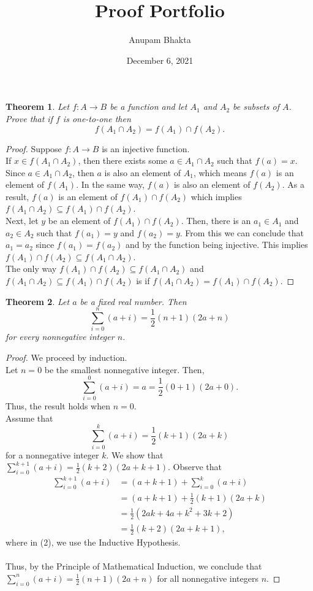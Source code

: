 \documentclass[11pt]{article}
\date{December 6, 2021}
\title{Proof Portfolio}
\author{Anupam Bhakta}
\newtheorem{theorem}{Theorem}
\begin{document}
	
\maketitle

\begin{theorem}
	Let $f:A\to B$ be a function and let $A_1$ and $A_2$ be subsets of $A$.  Prove that if $f$ is one-to-one then 
	\[f(A_1\cap A_2)=f(A_1)\cap f(A_2).\]
\end{theorem}

\begin{proof}
	Suppose $f:A\to B$ is an injective function. \\

	If $x \in f(A_1 \cap A_2)$, then there exists some $a \in A_1 \cap A_2$ such that $f(a) = x$. Since $a\in A_1\cap A_2$, then $a$ is also an element of $A_1$, which means $f(a)$ is an element of $f(A_1)$. In the same way, $f(a)$ is also an element of $f(A_2)$. As a result, $f(a)$ is an element of $f(A_1)\cap f(A_2)$ which implies $f(A_1\cap A_2)\subseteq f(A_1)\cap f(A_2)$. \\

	Next, let $y$ be an element of $f(A_1)\cap f(A_2)$. Then, there is an $a_1\in A_1$ and $a_2\in A_2$ such that $f(a_1)=y$ and $f(a_2)=y$. From this we can conclude that $a_1=a_2$ since $f(a_1)=f(a_2)$ and by the function being injective. This implies $f(A_1)\cap f(A_2)\subseteq f(A_1\cap A_2)$. \\

	The only way $f(A_1)\cap f(A_2)\subseteq f(A_1\cap A_2)$ and $f(A_1\cap A_2)\subseteq f(A_1)\cap f(A_2)$ is if $f(A_1\cap A_2)=f(A_1)\cap f(A_2)$.
\end{proof}

\newpage

\begin{theorem}
	Let $a$ be a fixed real number. Then 
	\[\sum_{i=0}^n(a+i)=\frac{1}{2}(n+1)(2a+n)\]
	for every nonnegative integer $n$.
\end{theorem}

\begin{proof}
	We proceed by induction. \\
	Let $n = 0$ be the smallest nonnegative integer. Then,
	$$\sum_{i=0}^{0}(a+i) = a = \frac{1}{2}(0+1)(2a+0).$$
	Thus, the result holds when $n = 0$. \\
	Assume that
	$$\sum_{i=0}^k(a+i)=\frac{1}{2}(k+1)(2a+k)$$
	for a nonnegative integer $k$. We show that $\sum_{i=0}^{k+1}(a+i)=\frac{1}{2}(k+2)(2a+k+1)$. Observe that
	\begin{align}
		\sum_{i=0}^{k+1}(a+i)&= (a+k+1) + \sum_{i=0}^{k}(a+i) \\
		&=(a+k+1) + \frac{1}{2}(k+1)(2a+k) \\
		&= \frac{1}{2}(2ak + 4a + k^2 +3k +2) \\
		&=\frac{1}{2}(k+2)(2a+k+1),
	\end{align}
	where in (2), we use the Inductive Hypothesis.\\\\
	Thus, by the Principle of Mathematical Induction, we conclude that $\sum_{i=0}^n(a+i)=\frac{1}{2}(n+1)(2a+n)$ for all nonnegative integers $n$.
\end{proof}
\end{document}
